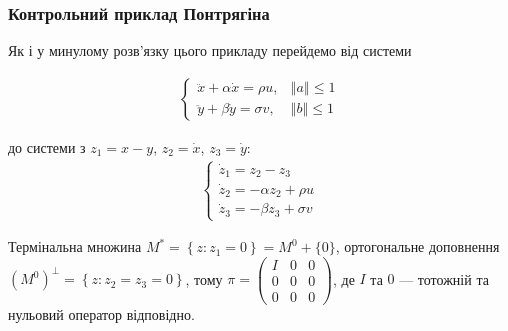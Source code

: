 \documentclass[10pt,pdf]{beamer}
\renewcommand{\d}[1]{\dot{#1}}
\newcommand{\dd}[1]{\ddot{#1}}
\renewcommand{\l}{\left}
\renewcommand{\r}{\right}
\newcommand{\norm}[1]{\left\Vert #1 \right\Vert}
\begin{document}
    \begin{frame}
        \frametitle{Контрольний приклад Понтрягіна}
    
        Як і у минулому розв’язку цього прикладу перейдемо від системи
    
        \begin{gather*}
            \begin{cases}
                \dd{x} + \alpha \d{x} = \rho u, & \norm{a} \leq 1 \\
                \dd{y} + \beta \d{y} = \sigma v, & \norm{b} \leq 1
            \end{cases}
        \end{gather*}

        до системи з $z_1 = x - y$, $z_2 = \d{x}$, $z_3 = \d{y}$:
        \begin{gather*}
            \begin{cases}
                \d{z}_1 = z_2 - z_3 \\
                \d{z}_2 = -\alpha z_2 + \rho u \\
                \d{z}_3 = -\beta z_3 + \sigma v
            \end{cases}
        \end{gather*}

        Термінальна множина $M^* = \l\{z: z_1 = 0 \r\} = M^0 + \{0\}$, ортогональне доповнення
        $(M^0)^\perp =\l\{z: z_2 = z_3 = 0 \r\}$, тому $\pi = \begin{pmatrix}
            I & 0 & 0 \\
            0 & 0 & 0 \\
            0 & 0 & 0
        \end{pmatrix}$, де $I$ та $0$ --- тотожній та нульовий оператор відповідно.

    \end{frame}
\end{document}
